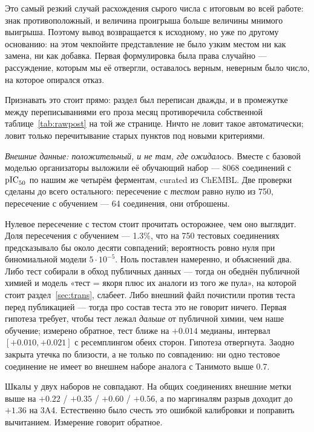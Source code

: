 Это самый резкий случай расхождения сырого числа с итоговым во всей работе: знак
противоположный, и величина проигрыша больше величины мнимого выигрыша. Поэтому вывод
возвращается к исходному, но уже по другому основанию: на этом чекпойнте представление не было
узким местом ни как замена, ни как добавка. Первая формулировка была права случайно ---
рассуждение, которым мы её отвергли, оставалось верным, неверным было число, на которое
опирался отказ.

Признавать это стоит прямо: раздел был переписан дважды, и в промежутке между переписываниями
его проза месяц противоречила собственной таблице~\ref{tab:rawpost} на той же странице.
Ничто не ловит такое автоматически; ловит только перечитывание старых пунктов под новыми
критериями.

\emph{Внешние данные: положительный, и не там, где ожидалось.} Вместе с базовой моделью
организаторы выложили её обучающий набор --- 8068 соединений с $\mathrm{pIC}_{50}$ по нашим же четырём
ферментам, curated из ChEMBL. Две проверки сделаны до всего остального: пересечение
с \emph{тестом} равно нулю из 750, пересечение с обучением --- 64 соединения, они отброшены.

Нулевое пересечение с тестом стоит прочитать осторожнее, чем оно выглядит. Доля пересечения
с обучением --- 1.3\%, что на 750 тестовых соединениях предсказывало бы около десяти
совпадений; вероятность ровно нуля при биномиальной модели $5\cdot10^{-5}$. Ноль поставлен
намеренно, и объяснений два. Либо тест собирали в обход публичных данных --- тогда он обеднён
публичной химией и модель «тест = якоря плюс их аналоги из того же пула», на которой стоит
раздел~\ref{sec:trans}, слабеет. Либо внешний файл почистили против теста перед публикацией
--- тогда про состав теста это не говорит ничего. Первая гипотеза требует, чтобы тест лежал
\emph{дальше} от публичной химии, чем наше обучение; измерено обратное, тест ближе на
$+0.014$ медианы, интервал $[+0.010, +0.021]$ с ресемплингом обеих сторон. Гипотеза
отвергнута. Заодно закрыта утечка по близости, а не только по совпадению: ни одно тестовое
соединение не имеет во внешнем наборе аналога с Танимото выше 0.7.

Шкалы у двух наборов не совпадают. На общих соединениях внешние метки выше на
$+0.22$ / $+0.35$ / $+0.60$ / $+0.56$, а по маргиналям разрыв доходит до $+1.36$ на 3A4.
Естественно было счесть это ошибкой калибровки и поправить вычитанием. Измерение говорит
обратное.


